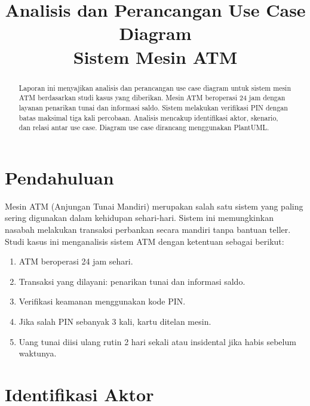 \documentclass[conference,10pt]{IEEEtran}
\begin{document}
\title{Analisis dan Perancangan Use Case Diagram\\Sistem Mesin ATM}

\author{
}

\maketitle

\begin{abstract}
Laporan ini menyajikan analisis dan perancangan use case diagram untuk sistem mesin ATM berdasarkan studi kasus yang diberikan. Mesin ATM beroperasi 24 jam dengan layanan penarikan tunai dan informasi saldo. Sistem melakukan verifikasi PIN dengan batas maksimal tiga kali percobaan. Analisis mencakup identifikasi aktor, skenario, dan relasi antar use case. Diagram use case dirancang menggunakan PlantUML.
\end{abstract}

\section{Pendahuluan}

Mesin ATM (Anjungan Tunai Mandiri) merupakan salah satu sistem yang paling sering digunakan dalam kehidupan sehari-hari. Sistem ini memungkinkan nasabah melakukan transaksi perbankan secara mandiri tanpa bantuan teller. Studi kasus ini menganalisis sistem ATM dengan ketentuan sebagai berikut:

\begin{enumerate}
\item ATM beroperasi 24 jam sehari.
\item Transaksi yang dilayani: penarikan tunai dan informasi saldo.
\item Verifikasi keamanan menggunakan kode PIN.
\item Jika salah PIN sebanyak 3 kali, kartu ditelan mesin.
\item Uang tunai diisi ulang rutin 2 hari sekali atau insidental jika habis sebelum waktunya.
\end{enumerate}

\section{Identifikasi Aktor}
\end{document}
